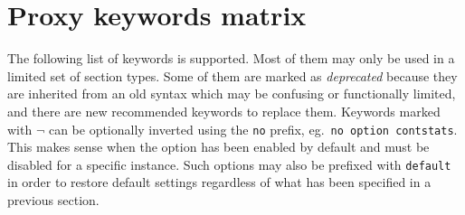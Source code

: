 
\section{Proxy keywords matrix}

\newcommand{\NO}{$\medcirc$}\newcommand{\YES}{$\medbullet$}

\newcommand{\optnopr}{ $\neg$}
\newcommand{\deprecated}[1]{\textsl{{\color{gray}#1}}}
\newcommand{\depword}[1]{\texttt{\deprecated{#1}}}

The following list of keywords is supported. Most of them may only be used in a
limited set of section types. Some of them are marked as \deprecated{deprecated} because
they are inherited from an old syntax which may be confusing or functionally
limited, and there are new recommended keywords to replace them. Keywords
marked with\optnopr{} can be optionally inverted using the \texttt{no} prefix,
eg.~\texttt{no option contstats}. This makes sense when the option has been enabled by default
and must be disabled for a specific instance. Such options may also be prefixed
with \texttt{default} in order to restore default settings regardless of what has been
specified in a previous  section.


